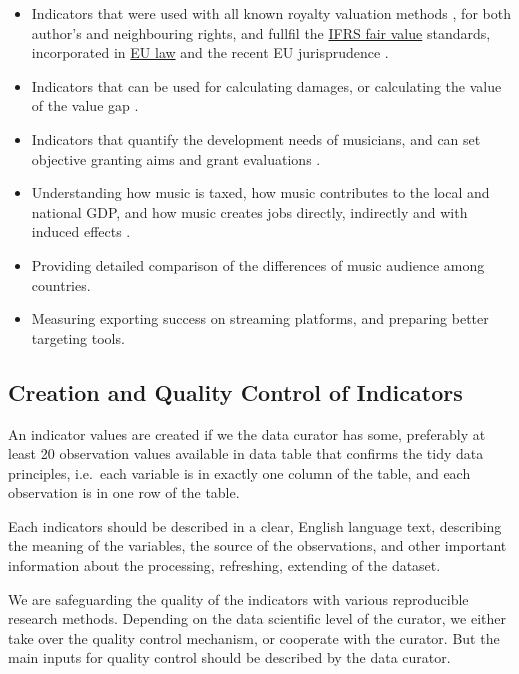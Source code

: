 \documentclass[
  a4paper,
  openany, a4paper, oneside]{book}
\begin{document}
\begin{itemize}
\item
  Indicators that were used with all known royalty valuation methods \citep{pwc_valuing_2008}, for both author's and neighbouring rights, and fullfil the \href{https://www.ifrs.org/issued-standards/list-of-standards/ifrs-13-fair-value-measurement/}{IFRS fair value} standards, incorporated in \href{https://eur-lex.europa.eu/legal-content/EN/TXT/HTML/?uri=CELEX:32012R1255\&from=EN\%7D}{EU law} and the recent EU jurisprudence \citep{cjeu_osa_2014, cjeu_akka_2017}.
\item
  Indicators that can be used for calculating damages, or calculating the value of the value gap \citep{antal_pcr_croatia_2019, antal_szabad_2019_en}.
\item
  Indicators that quantify the development needs of musicians, and can set objective granting aims and grant evaluations \citep{antal_javaslatok_2015}.
\item
  Understanding how music is taxed, how music contributes to the local and national GDP, and how music creates jobs directly, indirectly and with induced effects \citep{antal_slovenskom_hudobnom_2019}.
\item
  Providing detailed comparison of the differences of music audience among countries.
\item
  Measuring exporting success on streaming platforms, and preparing better targeting tools.
\end{itemize}

\hypertarget{authoring-indicator}{%
\subsection{Creation and Quality Control of Indicators}\label{authoring-indicator}}

An indicator values are created if we the data curator has some, preferably at least 20 observation values available in data table that confirms the tidy data principles, i.e.~each variable is in exactly one column of the table, and each observation is in one row of the table.

Each indicators should be described in a clear, English language text, describing the meaning of the variables, the source of the observations, and other important information about the processing, refreshing, extending of the dataset.

We are safeguarding the quality of the indicators with various reproducible research methods. Depending on the data scientific level of the curator, we either take over the quality control mechanism, or cooperate with the curator. But the main inputs for quality control should be described by the data curator.
\end{document}

